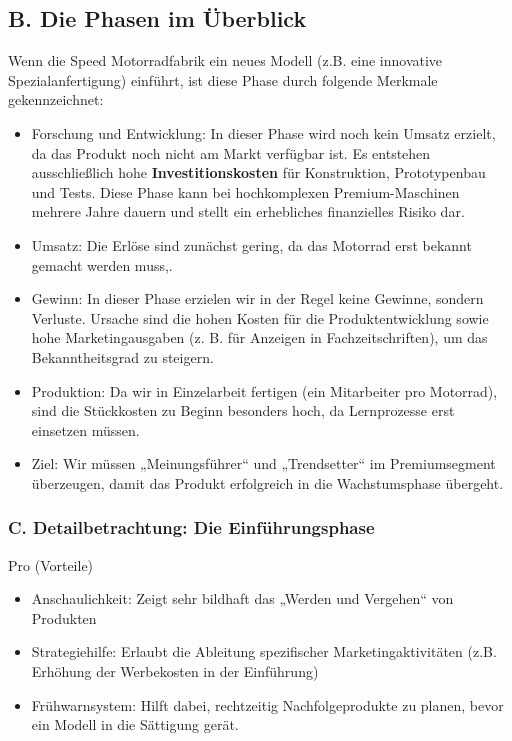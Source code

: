 \documentclass[12pt, a4paper]{article}
\begin{document}
\subsection{B. Die Phasen im Überblick}
Wenn die Speed Motorradfabrik ein neues Modell (z.B. eine innovative Spezialanfertigung) einführt, ist diese Phase durch folgende Merkmale gekennzeichnet:
\begin{itemize}
    \item Forschung und Entwicklung: In dieser Phase wird noch kein Umsatz erzielt, da das Produkt noch nicht am Markt verfügbar ist. Es entstehen ausschließlich hohe \textbf{Investitionskosten} für Konstruktion, Prototypenbau und Tests. Diese Phase kann bei hochkomplexen Premium-Maschinen mehrere Jahre dauern und stellt ein erhebliches finanzielles Risiko dar.
    \item Umsatz: Die Erlöse sind zunächst gering, da das Motorrad erst bekannt gemacht werden muss,.
    \item Gewinn: In dieser Phase erzielen wir in der Regel keine Gewinne, sondern Verluste. Ursache sind die hohen Kosten für die Produktentwicklung sowie hohe Marketingausgaben (z. B. für Anzeigen in Fachzeitschriften), um das Bekanntheitsgrad zu steigern.
    \item Produktion: Da wir in Einzelarbeit fertigen (ein Mitarbeiter pro Motorrad), sind die Stückkosten zu Beginn besonders hoch, da Lernprozesse erst einsetzen müssen.
    \item Ziel: Wir müssen „Meinungsführer“ und „Trendsetter“ im Premiumsegment überzeugen, damit das Produkt erfolgreich in die Wachstumsphase übergeht.
\end{itemize}

\subsubsection{C. Detailbetrachtung: Die Einführungsphase}
Pro (Vorteile) \newline
\begin{itemize}
    \item Anschaulichkeit: Zeigt sehr bildhaft das „Werden und Vergehen“ von Produkten
    \item Strategiehilfe: Erlaubt die Ableitung spezifischer Marketingaktivitäten (z.B. Erhöhung der Werbekosten in der Einführung)
    \item Frühwarnsystem: Hilft dabei, rechtzeitig Nachfolgeprodukte zu planen, bevor ein Modell in die Sättigung gerät.
\end{itemize}
\end{document}
